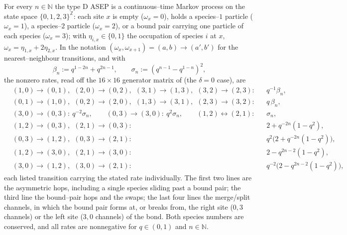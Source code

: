 \documentclass[11pt]{article}
\theoremstyle{plain}
\theoremstyle{definition}
\theoremstyle{remark}
\newcommand{\Z}{\mathbb{Z}}\newcommand{\R}{\mathbb{R}}\newcommand{\N}{\mathbb{N}}
\begin{document}
For every $n\in\N$ the type D ASEP is a continuous--time Markov process on the state
space $\{0,1,2,3\}^\Z$: each site $x$ is empty ($\omega_x=0$), holds a species--$1$
particle ($\omega_x=1$), a species--$2$ particle ($\omega_x=2$), or a bound pair
carrying one particle of each species ($\omega_x=3$); with $\eta_{i,x}\in\{0,1\}$ the
occupation of species $i$ at $x$, $\omega_x=\eta_{1,x}+2\eta_{2,x}$. In the notation
$(\omega_x,\omega_{x+1})=(a,b)\to(a',b')$ for the nearest--neighbour transitions, and
with
\begin{equation}\label{eq:nparams}
  \beta_n:=q^{1-2n}+q^{2n-1},\qquad \sigma_n:=(q^{n-1}-q^{1-n})^2,
\end{equation}
the nonzero rates, read off the $16\times16$ generator matrix of \cite[\S2.1]{REU}
(the $\delta=0$ case), are
\begin{equation}\label{eq:nrates}
\begin{aligned}
&(1,0)\!\to\!(0,1),\ \ (2,0)\!\to\!(0,2),\ \ (3,1)\!\to\!(1,3),\ \ (3,2)\!\to\!(2,3):
 && q^{-1}\beta_n,\\
&(0,1)\!\to\!(1,0),\ \ (0,2)\!\to\!(2,0),\ \ (1,3)\!\to\!(3,1),\ \ (2,3)\!\to\!(3,2):
 && q\,\beta_n,\\
&(3,0)\!\to\!(0,3):\ q^{-2}\sigma_n,\qquad (0,3)\!\to\!(3,0):\ q^{2}\sigma_n,\qquad
 (1,2)\!\leftrightarrow\!(2,1):&& \sigma_n,\\
&(1,2)\!\to\!(0,3),\ \ (2,1)\!\to\!(0,3):&& 2+q^{-2n}(1-q^2),\\
&(0,3)\!\to\!(1,2),\ \ (0,3)\!\to\!(2,1):&& q^{2}\big(2+q^{-2n}(1-q^2)\big),\\
&(1,2)\!\to\!(3,0),\ \ (2,1)\!\to\!(3,0):&& 2-q^{2n-2}(1-q^2),\\
&(3,0)\!\to\!(1,2),\ \ (3,0)\!\to\!(2,1):&& q^{-2}\big(2-q^{2n-2}(1-q^2)\big),
\end{aligned}
\end{equation}
each listed transition carrying the stated rate individually. The first two lines are
the asymmetric hops, including a single species sliding past a bound pair; the third
line the bound--pair hops and the swaps; the last four lines the merge/split
channels, in which the bound pair forms at, or breaks from, the right site ($0,3$
channels) or the left site ($3,0$ channels) of the bond. Both species numbers are
conserved, and all rates are nonnegative for $q\in(0,1)$ and $n\in\N$.
\end{document}
